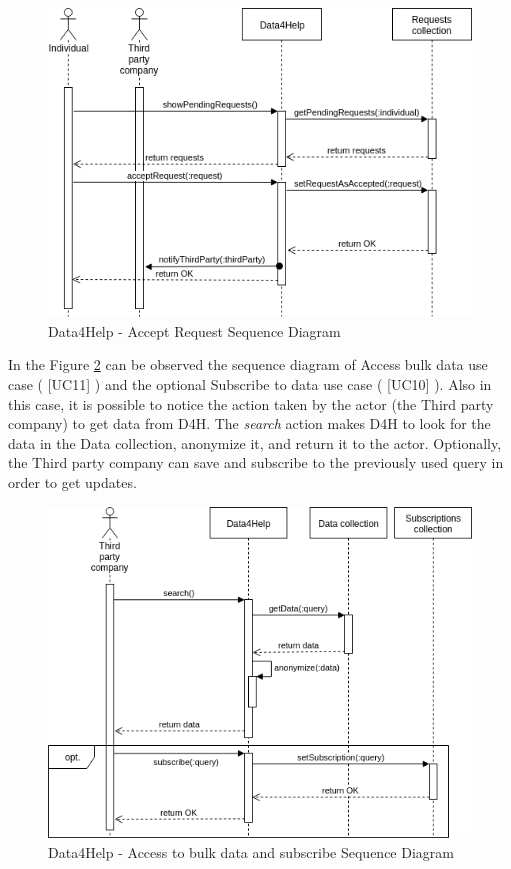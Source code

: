 \documentclass[hidelinks, 12pt]{report}
\newcommand\usecase[1]{ [UC#1] }
\begin{document}
	\begin{figure}[H]
		\centering
		\includegraphics[scale=0.6]{Diagrams/d4h_seq_accept_request.png}
		\caption[Data4Help - Accept Request Sequence Diagram]{Data4Help - Accept Request Sequence Diagram}
		\label{fig:d4h_seq_accept_request}
	\end{figure}
	
	In the Figure \ref{fig:d4h_seq_bulk_data} can be observed the sequence diagram of Access bulk data use case (\usecase{11}) and the optional Subscribe to data use case (\usecase{10}). Also in this case, it is possible to notice the action taken by the actor (the Third party company) to get data from D4H. The \textit{search} action makes D4H to look for the data in the Data collection, anonymize it, and return it to the actor. Optionally, the Third party company can save and subscribe to the previously used query in order to get updates.\\
	
	\begin{figure}[H]
		\centering
		\includegraphics[scale=0.6]{Diagrams/d4h_seq_subscribe_to_bulk_query.png}
		\caption[Data4Help - Access to bulk data and subscribe Sequence Diagram]{Data4Help - Access to bulk data and subscribe Sequence Diagram}
		\label{fig:d4h_seq_bulk_data}
	\end{figure}
	
\end{document}
